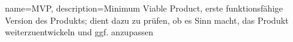 

{
    name=MVP,
    description={Minimum Viable Product, erste funktionsfähige Version des Produkts; dient dazu zu prüfen, ob es Sinn macht, das Produkt weiterzuentwickeln und ggf. anzupassen}
}
